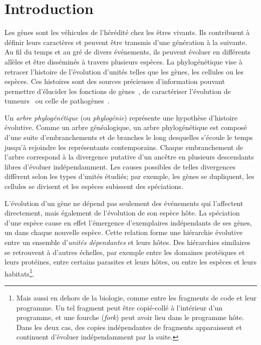 \chapter*{Introduction}

Les gènes sont les véhicules de l’hérédité chez les êtres vivants.
Ils contribuent à définir leurs caractères et peuvent être transmis d’une génération à la suivante.
Au fil du temps et au gré de divers événements, ils peuvent évoluer en différents allèles et être disséminés à travers plusieurs espèces.
La phylogénétique vise à retracer l’histoire de l’évolution d’unités telles que les gènes, les cellules ou les espèces.
Ces histoires sont des sources précieuses d’information pouvant permettre d’élucider les fonctions de gènes~\parencite{Lynch2001ProbabilityPreservationNewly}, de caractériser l’évolution de tumeurs~\parencite{Quinn2021SingleCellLineages} ou celle de pathogènes~\parencite{Morel2020PhylogeneticAnalysisSars,Guindon2022EclairerOriginesCOVID19}.

Un \emph{arbre phylogénétique} (ou \emph{phylogénie}) représente une hypothèse d’histoire évolutive.
Comme un arbre généalogique, un arbre phylogénétique est composé d’une suite d’embranchements et de branches le long desquelles s’écoule le temps jusqu’à rejoindre les représentants contemporains.
Chaque embranchement de l’arbre correspond à la divergence putative d’un ancêtre en plusieurs descendants libres d’évoluer indépendamment.
Les causes possibles de telles divergences diffèrent selon les types d’unités étudiés; par exemple, les gènes se dupliquent, les cellules se divisent et les espèces subissent des spéciations.

L’évolution d’un gène ne dépend pas seulement des événements qui l’affectent directement, mais également de l’évolution de son espèce hôte.
La spéciation d’une espèce cause en effet l’émergence d’exemplaires indépendants de ses gènes, un dans chaque nouvelle espèce.
Cette relation forme une hiérarchie évolutive entre un ensemble d’\emph{unités dépendantes} et leurs hôtes.
Des hiérarchies similaires se retrouvent à d’autres échelles, par exemple entre les domaines protéiques et leurs protéines, entre certains parasites et leurs hôtes, ou entre les espèces et leurs habitats\footnote{Mais aussi en dehors de la biologie, comme entre les fragments de code et leur programme. Un tel fragment peut être copié-collé à l’intérieur d’un programme, et une fourche (\emph{fork}) peut avoir lieu dans le programme hôte. Dans les deux cas, des copies indépendantes de fragments apparaissent et continuent d’évoluer indépendamment par la suite.}.

